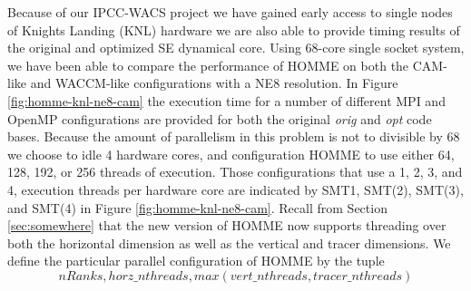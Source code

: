 Because of our IPCC-WACS project we have gained early access to single nodes of Knights Landing (KNL) hardware we are also able to provide timing results of the original and optimized SE dynamical core.  Using 68-core single socket system, we have been able to compare the performance of HOMME on both the CAM-like and WACCM-like configurations with a NE8 resolution.  In Figure \ref{fig:homme-knl-ne8-cam} the execution time for a number of different MPI and OpenMP configurations are provided for both the original {\em orig} and {\em opt} code bases.  Because the amount of parallelism in this problem is not to divisible by 68 we choose to idle 4 hardware cores, and configuration HOMME to use either 64, 128, 192, or 256 threads of execution.  Those configurations that use a 1, 2, 3, and 4, execution threads per hardware core are indicated by SMT{1}, SMT(2), SMT(3), and SMT(4) in Figure \ref{fig:homme-knl-ne8-cam}.  Recall from Section \ref{sec:somewhere} that the new version of HOMME  now supports threading over both the horizontal dimension as well as the vertical and tracer dimensions.  We define the particular parallel configuration of HOMME by the tuple 
$$
nRanks,  horz\_nthreads, max(vert\_nthreads,tracer\_nthreads)
$$

